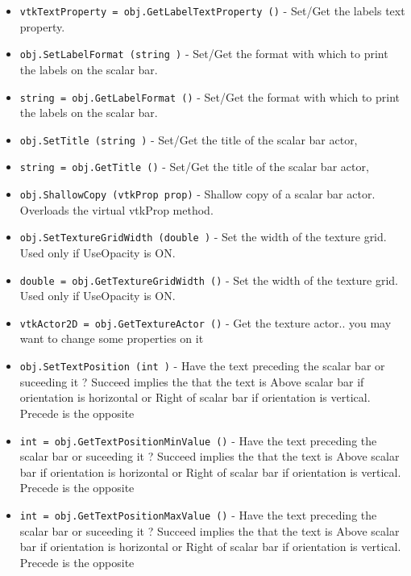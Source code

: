 \begin{itemize}
\item  \verb|vtkTextProperty = obj.GetLabelTextProperty ()| -  Set/Get the labels text property.

\item  \verb|obj.SetLabelFormat (string )| -  Set/Get the format with which to print the labels on the scalar
 bar.

\item  \verb|string = obj.GetLabelFormat ()| -  Set/Get the format with which to print the labels on the scalar
 bar.

\item  \verb|obj.SetTitle (string )| -  Set/Get the title of the scalar bar actor,

\item  \verb|string = obj.GetTitle ()| -  Set/Get the title of the scalar bar actor,

\item  \verb|obj.ShallowCopy (vtkProp prop)| -  Shallow copy of a scalar bar actor. Overloads the virtual vtkProp method.

\item  \verb|obj.SetTextureGridWidth (double )| -  Set the width of the texture grid. Used only if UseOpacity is ON.

\item  \verb|double = obj.GetTextureGridWidth ()| -  Set the width of the texture grid. Used only if UseOpacity is ON.

\item  \verb|vtkActor2D = obj.GetTextureActor ()| -  Get the texture actor.. you may want to change some properties on it

\item  \verb|obj.SetTextPosition (int )| -  Have the text preceding the scalar bar or suceeding it ?
 Succeed implies the that the text is Above scalar bar if orientation 
 is horizontal or Right of scalar bar if orientation is vertical.
 Precede is the opposite

\item  \verb|int = obj.GetTextPositionMinValue ()| -  Have the text preceding the scalar bar or suceeding it ?
 Succeed implies the that the text is Above scalar bar if orientation 
 is horizontal or Right of scalar bar if orientation is vertical.
 Precede is the opposite

\item  \verb|int = obj.GetTextPositionMaxValue ()| -  Have the text preceding the scalar bar or suceeding it ?
 Succeed implies the that the text is Above scalar bar if orientation 
 is horizontal or Right of scalar bar if orientation is vertical.
 Precede is the opposite


\end{itemize}
